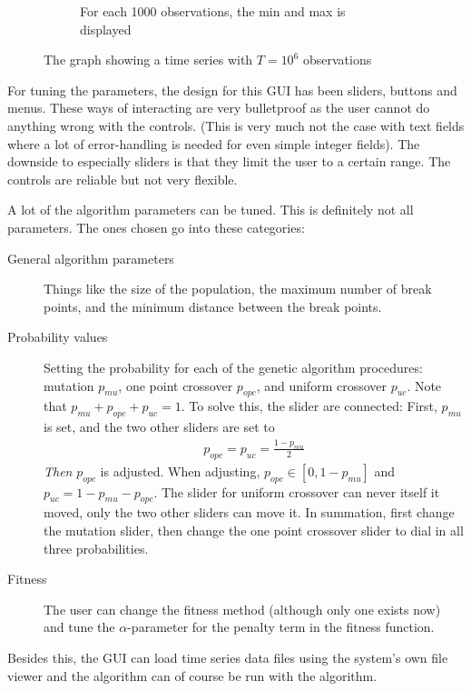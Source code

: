 \begin{figure}[ht]
\begin{subfigure}[b]{.48\textwidth}
        \caption{For each 1000 observations, the min and max is displayed}
        \label{fig:gui-graph-min-max}
    \end{subfigure}
    \caption{The graph showing a time series with $T = 10^6$ observations}
    \label{fig:gui-graph-ex}
\end{figure}

For tuning the parameters, the design for this GUI has been sliders, buttons and
menus. These ways of interacting are very bulletproof as the user cannot do
anything wrong with the controls. (This is very much not the case with text
fields where a lot of error-handling is needed for even simple integer fields).
The downside to especially sliders is that they limit the user to a certain
range. The controls are reliable but not very flexible. 

A lot of the algorithm parameters can be tuned. This is definitely not all
parameters. The ones chosen go into these categories: 
\begin{description}
    \item[General algorithm parameters] Things like the size of the population,
    the maximum number of break points, and the minimum distance between the
    break points. 

    \item[Probability values] Setting the probability for each of the genetic
    algorithm procedures: mutation $p_{mu}$, one point crossover $p_{opc}$, and
    uniform crossover $p_{uc}$. Note that $p_{mu} + p_{opc} + p_{uc} = 1$. To
    solve this, the slider are connected: First, $p_{mu}$ is set, and the two
    other sliders are set to 
    \begin{align*}
        p_{opc} = p_{uc} = \frac{1 - p_{mu}}{2}
    \end{align*}
    \textit{Then} $p_{opc}$ is adjusted. When adjusting, $p_{opc} \in [0, 1 -
    p_{mu}]$ and $p_{uc} = 1 - p_{mu} - p_{opc}$. The slider for uniform
    crossover can never itself it moved, only the two other sliders can move it.
    In summation, first change the
    mutation slider, then change the one point crossover slider to dial in all
    three probabilities. 

    \item[Fitness] The user can change the fitness method (although only
    one exists now) and tune the $\alpha$-parameter for the penalty term in the
    fitness function. 
\end{description}

Besides this, the GUI can load time series data files using the system's own
file viewer and the algorithm can of course be run with the algorithm. 


